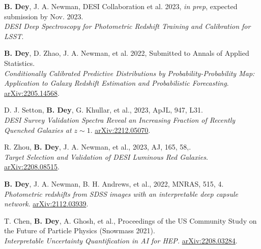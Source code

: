  \begin{etaremune}[leftmargin=40pt,labelsep=10pt]

    \item \textbf{B. Dey}, J. A. Newman, DESI Collaboration et al. 2023, \textit{in prep}, expected submission by Nov. 2023.\\
    \textrm{\textit{DESI Deep Spectroscopy for Photometric Redshift Training and Calibration for LSST}}. %
    
    
    \item  \textbf{B. Dey}, D. Zhao, J. A. Newman, et al. 2022, Submitted to Annals of Applied Statistics.\\
    \textrm{\textit{Conditionally Calibrated Predictive Distributions by Probability-Probability Map: Application to Galaxy Redshift Estimation and Probabilistic Forecasting}}.  \href{https://arxiv.org/abs/2205.14568}{arXiv:2205.14568}.
    
    \item D. J. Setton, \textbf{B. Dey}, G. Khullar, et al., 2023, ApJL, 947, L31.\\ \textrm{\textit{DESI Survey Validation Spectra Reveal an Increasing Fraction of Recently Quenched Galaxies at $z\sim 1$}}. \href{https://arxiv.org/abs/2212.05070}{arXiv:2212.05070}.
    
    \item R. Zhou, \textbf{B. Dey}, J. A. Newman, et al., 2023, AJ, 165, 58,.\\ \textrm{\textit{Target Selection and Validation of DESI Luminous Red Galaxies}}. \href{https://arxiv.org/abs/2208.08515}{arXiv:2208.08515}.
    
    \item  \textbf{B. Dey}, J. A. Newman, B. H. Andrews, et al., 2022, MNRAS, 515, 4.\\ \textrm{\textit{Photometric redshifts from SDSS images with an interpretable deep capsule network}}. \href{https://arxiv.org/abs/2112.03939}{arXiv:2112.03939}.
    
    \item T. Chen, \textbf{B. Dey}, A. Ghosh, et al., Proceedings of the US Community Study on the Future of Particle Physics (Snowmass 2021).\\ \textrm{\textit{Interpretable Uncertainty Quantification in AI for HEP.}} \href{https://arxiv.org/abs/2208.03284}{arXiv:2208.03284}.
    

\end{etaremune}
